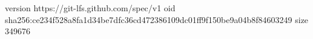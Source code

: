 version https://git-lfs.github.com/spec/v1
oid sha256:ce234f528a8fa1d34be7dfc36cd472386109dc01ff9f150be9a04b8f84603249
size 349676
